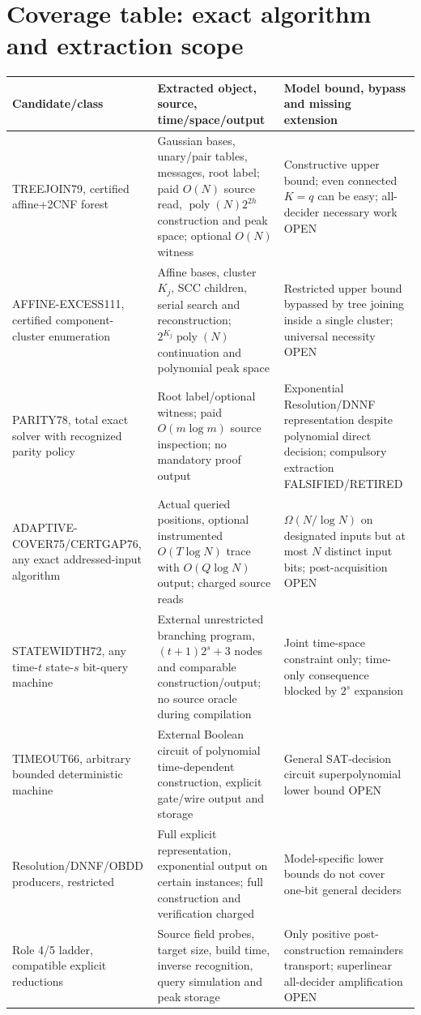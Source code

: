 \documentclass[11pt]{article}
\begin{document}
\section{Coverage table: exact algorithm and extraction scope}
\small
\begin{longtable}{p{.18\linewidth}p{.33\linewidth}p{.40\linewidth}}
\toprule
Candidate/class & Extracted object, source, time/space/output & Model bound, bypass and missing extension\\
\midrule\endhead
TREEJOIN79, certified affine+2CNF forest &
Gaussian bases, unary/pair tables, messages, root label; paid $O(N)$ source read, $\operatorname{poly}(N)2^{2h}$ construction and peak space; optional $O(N)$ witness &
Constructive upper bound; even connected $K=q$ can be easy; all-decider necessary work OPEN\\
AFFINE-EXCESS111, certified component-cluster enumeration &
Affine bases, cluster $K_j$, SCC children, serial search and reconstruction; $2^{K_j}\operatorname{poly}(N)$ continuation and polynomial peak space &
Restricted upper bound bypassed by tree joining inside a single cluster; universal necessity OPEN\\
PARITY78, total exact solver with recognized parity policy &
Root label/optional witness; paid $O(m\log m)$ source inspection; no mandatory proof output &
Exponential Resolution/DNNF representation despite polynomial direct decision; compulsory extraction FALSIFIED/RETIRED\\
ADAPTIVE-COVER75/CERTGAP76, any exact addressed-input algorithm &
Actual queried positions, optional instrumented $O(T\log N)$ trace with $O(Q\log N)$ output; charged source reads &
$\Omega(N/\log N)$ on designated inputs but at most $N$ distinct input bits; post-acquisition OPEN\\
STATEWIDTH72, any time-$t$ state-$s$ bit-query machine &
External unrestricted branching program, $(t+1)2^s+3$ nodes and comparable construction/output; no source oracle during compilation &
Joint time-space constraint only; time-only consequence blocked by $2^s$ expansion\\
TIMEOUT66, arbitrary bounded deterministic machine &
External Boolean circuit of polynomial time-dependent construction, explicit gate/wire output and storage &
General SAT-decision circuit superpolynomial lower bound OPEN\\
Resolution/DNNF/OBDD producers, restricted &
Full explicit representation, exponential output on certain instances; full construction and verification charged &
Model-specific lower bounds do not cover one-bit general deciders\\
Role 4/5 ladder, compatible explicit reductions &
Source field probes, target size, build time, inverse recognition, query simulation and peak storage &
Only positive post-construction remainders transport; superlinear all-decider amplification OPEN\\
\bottomrule
\end{longtable}
\end{document}
